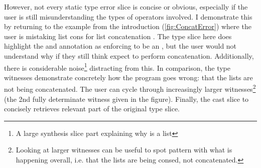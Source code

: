 However, not every static type error slice is concise or obvious, especially if the user is still misunderstanding the types of operators involved. I demonstrate this by returning to the example from the introduction (\cref{fig:ConcatError}) where the user is mistaking list cons \code{::} for list concatenation . The type slice here does highlight the \code{::} and annotation as enforcing  to be an , but the user would not understand why if they still think expect \code{::} to perform concatenation. Additionally, there is considerable noise\footnote{A large synthesis slice part explaining why  is a list} distracting from this. In comparison, the type witnesses demonstrate concretely how the program goes wrong: that the lists are not being concatenated. The user can cycle through increasingly larger witnesses\footnote{Looking at larger witnesses can be useful to spot pattern with what is happening overall, i.e. that the lists are being consed, not concatenated.} (the 2nd fully determinate witness given in the figure). Finally, the cast slice to  concisely retrieves relevant part of the original type slice.
